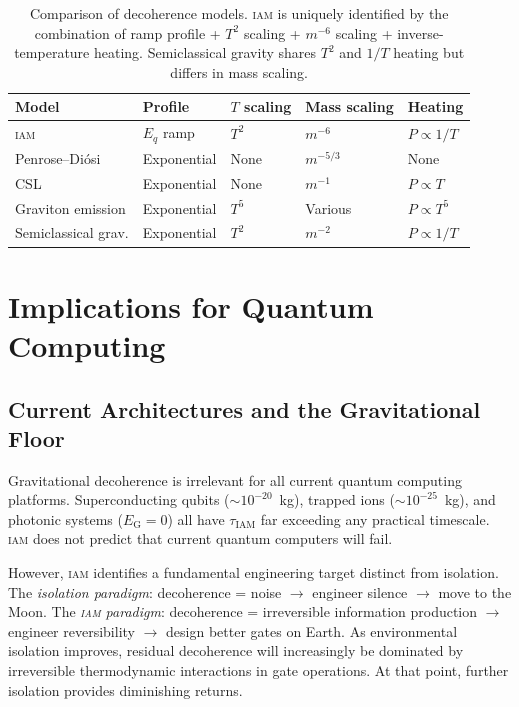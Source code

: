 \documentclass[12pt,letterpaper]{article}
\newcommand{\IAM}{\textsc{iam}}
\newcommand{\EG}{E_{\mathrm{G}}}
\newcommand{\tauIAM}{\tau_{\mathrm{IAM}}}
\begin{document}
\begin{table}[H]
\centering
\caption{Comparison of decoherence models. \IAM{} is uniquely identified
by the combination of ramp profile + $T^2$ scaling + $m^{-6}$ scaling +
inverse-temperature heating. Semiclassical gravity shares $T^2$ and $1/T$
heating but differs in mass scaling.}
\label{tab:models}
\begin{tabular}{lllll}
\toprule
Model & Profile & $T$ scaling & Mass scaling & Heating \\
\midrule
\IAM{}              & $E_q$ ramp   & $T^2$    & $m^{-6}$   & $P \propto 1/T$ \\
Penrose--Di\'{o}si  & Exponential  & None     & $m^{-5/3}$ & None \\
CSL                 & Exponential  & None     & $m^{-1}$   & $P \propto T$ \\
Graviton emission   & Exponential  & $T^5$    & Various    & $P \propto T^5$ \\
Semiclassical grav. & Exponential  & $T^2$    & $m^{-2}$   & $P \propto 1/T$ \\
\bottomrule
\end{tabular}
\end{table}

\section{Implications for Quantum Computing}

\subsection{Current Architectures and the Gravitational Floor}

Gravitational decoherence is irrelevant for all current quantum computing
platforms. Superconducting qubits ($\sim 10^{-20}$~kg), trapped ions
($\sim 10^{-25}$~kg), and photonic systems ($\EG = 0$) all have $\tauIAM$
far exceeding any practical timescale. \IAM{} does not predict that current
quantum computers will fail.

However, \IAM{} identifies a fundamental engineering target distinct from
isolation. The \emph{isolation paradigm}: decoherence = noise $\to$ engineer
silence $\to$ move to the Moon. The \emph{\IAM{} paradigm}: decoherence =
irreversible information production $\to$ engineer reversibility $\to$
design better gates on Earth. As environmental isolation improves, residual
decoherence will increasingly be dominated by irreversible thermodynamic
interactions in gate operations. At that point, further isolation provides
diminishing returns.
\end{document}
